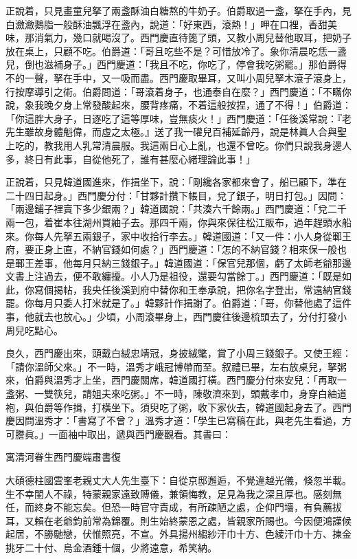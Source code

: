 正說着，只見畫童兒拏了兩盞酥油白糖熬的牛奶子。伯爵取過一盞，拏在手內，見白瀲瀲鵝脂一般酥油飄浮在盞內，說道：「好東西，滾熱！」呷在口裡，香甜美味，那消氣力，幾口就喝沒了。西門慶直待篦了頭，又教小周兒替他取耳，把奶子放在桌上，只顧不吃。伯爵道：「哥且吃些不是？可惜放冷了。象你清晨吃恁一盞兒，倒也滋補身子。」西門慶道：「我且不吃，你吃了，停會我吃粥罷。」那伯爵得不的一聲，拏在手中，又一吸而盡。{}西門慶取畢耳，又叫小周兒拏木滾子滾身上，行按摩導引之術。伯爵問道：「哥滾着身子，也通泰自在麼？」西門慶道：「不瞞你說，象我晚夕身上常發酸起來，腰背疼痛，不着這般按捏，通了不得！」伯爵道：「你這胖大身子，日逐吃了這等厚味，豈無痰火！」西門慶道：「任後溪常說：『老先生雖故身體魁偉，而虛之太極。』送了我一礶兒百補延齡丹，說是林眞人合與聖上吃的，教我用人乳常清晨服。我這兩日心上亂，也還不曾吃。你們只說我身邊人多，終日有此事，自從他死了，誰有甚麼心緒理論此事！」{}

正說着，只見韓道國進來，作揖坐下，說：「剛纔各家都來會了，船已顧下，準在二十四日起身。」西門慶分付：「甘夥計攢下帳目，兌了銀子，明日打包。」因問：「兩邊鋪子裡賣下多少銀兩？」韓道國說：「共湊六千餘兩。」西門慶道：「兌二千兩一包，着崔本往湖州買紬子去。那四千兩，你與來保往松江販布，過年趕頭水船來。你每人先拏五兩銀子，家中收拾行李去。」韓道國道：「又一件：小人身從鄆王府，要正身上直，不納官錢如何處？」西門慶道：「怎的不納官錢？相來保一般也是鄆王差事，他每月只納三錢銀子。」韓道國道：「保官兒那個，虧了太師老爺那邊文書上注過去，便不敢纏擾。小人乃是祖役，還要勾當餘丁。」西門慶道：「既是如此，你寫個揭帖，我央任後溪到府中替你和王奉承說，把你名字登出，常遠納官錢罷。你每月只委人打米就是了。」韓夥計作揖謝了。伯爵道：「哥，你替他處了這件事，他就去也放心。」少頃，小周滾畢身上，西門慶往後邊梳頭去了，分付打發小周兒吃點心。

良久，西門慶出來，頭戴白絨忠靖冠，身披絨氅，賞了小周三錢銀子。又使王經：「請你溫師父來。」不一時，溫秀才峨冠博帶而至。叙禮已畢，左右放桌兒，拏粥來，伯爵與溫秀才上坐，西門慶關席，韓道國打橫。西門慶分付來安兒：「再取一盞粥、一雙筷兒，請姐夫來吃粥。」不一時，陳敬濟來到，頭戴孝巾，身穿白紬道袍，與伯爵等作揖，打橫坐下。須臾吃了粥，收下家伙去，韓道國起身去了。西門慶因問溫秀才：「書寫了不曾？」溫秀才道：「學生已寫稿在此，與老先生看過，方可謄眞。」一面袖中取出，遞與西門慶觀看。其書曰：

\begin{myquote}[\markfont]
寓清河眷生西門慶端肅書復

大碩德柱國雲峯老親丈大人先生臺下：自從京邸邂逅，不覺違越光儀，倏忽半載。生不幸閨人不祿，特蒙親家遠致賻儀，兼領悔教，足見為我之深且厚也。感刻無任，而終身不能忘矣。但恐一時官守責成，有所疎陋之處，企仰門墻，有負薦拔耳，又賴在老爺鈞前常為錦覆。則生始終蒙恩之處，皆親家所賜也。今因便鴻謹候起居，不勝馳戀，伏惟照亮，不宣。外具揚州縐紗汗巾十方、色綾汗巾十方、揀金挑牙二十付、烏金酒鍾十個，少將遠意，希笑納。
\end{myquote}

